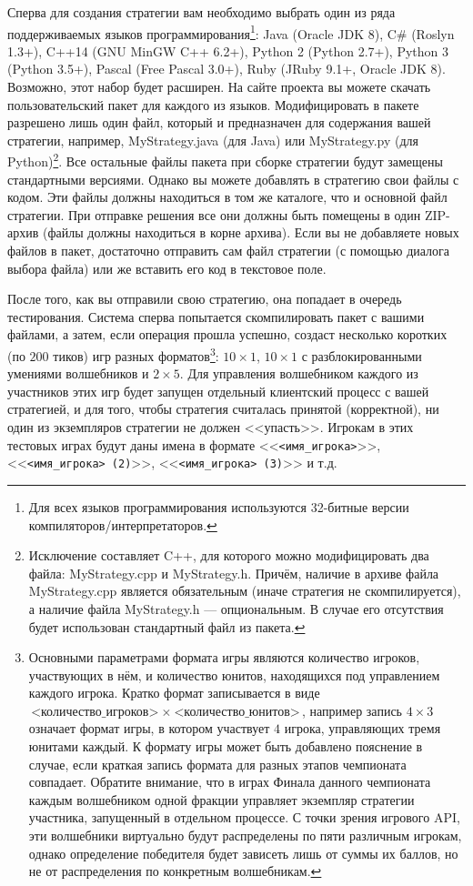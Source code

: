 Сперва для создания стратегии вам необходимо выбрать один из ряда поддерживаемых языков программирования\footnote[14]{Для всех языков
программирования используются 32-битные версии компиляторов/интерпретаторов.}: Java (Oracle JDK 8), C\# (Roslyn 1.3+), C++14 (GNU MinGW C++
6.2+), Python 2 (Python 2.7+), Python 3 (Python 3.5+), Pascal (Free Pascal 3.0+), Ruby (JRuby 9.1+, Oracle JDK 8). Возможно, этот набор
будет расширен. На сайте проекта вы можете скачать пользовательский пакет для каждого из языков. Модифицировать в пакете разрешено лишь один
файл, который и предназначен для содержания вашей стратегии, например, MyStrategy.java (для Java) или MyStrategy.py (для
Python)\footnote[15]{Исключение составляет C++, для которого можно модифицировать два файла: MyStrategy.cpp и MyStrategy.h. Причём, наличие
в архиве файла MyStrategy.cpp является обязательным (иначе стратегия не скомпилируется), а наличие файла MyStrategy.h --- опциональным. В
случае его отсутствия будет использован стандартный файл из пакета.}. Все остальные файлы пакета при сборке стратегии будут замещены
стандартными версиями. Однако вы можете добавлять в стратегию свои файлы с кодом. Эти файлы должны находиться в том же каталоге, что и
основной файл стратегии. При отправке решения все они должны быть помещены в один ZIP-архив (файлы должны находиться в корне архива). Если
вы не добавляете новых файлов в пакет, достаточно отправить сам файл стратегии (с помощью диалога выбора файла) или же вставить его код в
текстовое поле.

После того, как вы отправили свою стратегию, она попадает в очередь тестирования. Система сперва попытается скомпилировать пакет с вашими
файлами, а затем, если операция прошла успешно, создаст несколько коротких (по $200$ тиков) игр разных форматов\footnote[16]{Основными
параметрами формата игры являются количество игроков, участвующих в нём, и количество юнитов, находящихся под управлением каждого игрока.
Кратко формат записывается в виде $\texttt{<количество\_игроков>}~\times~\texttt{<количество\_юнитов>}$, например запись $4\times3$ означает
формат игры, в котором участвует $4$ игрока, управляющих тремя юнитами каждый. К формату игры может быть добавлено пояснение в случае, если
краткая запись формата для разных этапов чемпионата совпадает. Обратите внимание, что в играх Финала данного чемпионата каждым волшебником
одной фракции управляет экземпляр стратегии участника, запущенный в отдельном процессе. С точки зрения игрового API, эти волшебники
виртуально будут распределены по пяти различным игрокам, однако определение победителя будет зависеть лишь от суммы их баллов, но не от
распределения по конкретным волшебникам.}: $10\times1$, $10\times1$ с разблокированными умениями волшебников и $2\times5$. Для управления
волшебником каждого из участников этих игр будет запущен отдельный клиентский процесс с вашей стратегией, и для того, чтобы стратегия
считалась принятой (корректной), ни один из экземпляров стратегии не должен <<упасть>>. Игрокам в этих тестовых играх будут даны имена в
формате <<\texttt{<имя\_игрока>}>>, <<\texttt{<имя\_игрока> (2)}>>, <<\texttt{<имя\_игрока> (3)}>> и т.д.

